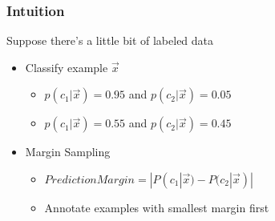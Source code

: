 \documentclass{beamer}
\begin{document}
\begin{frame}                                                                                                 
\frametitle{Intuition}                                                                                  
Suppose there's a little bit of labeled data                                                                  
\newline                                                                                                      
  \begin{itemize}                                                                                             
  \item Classify example $\vec{x}$                                                                               
  \begin{itemize}                                                                                             
    \item $p(c_1 | \vec{x}) = 0.95$ and $p(c_2 | \vec{x}) = 0.05$                                     
    \item $p(c_1 | \vec{x}) = 0.55$ and $p(c_2 | \vec{x}) = 0.45$                                      
    \newline                                                                                                  
  \end{itemize}                                                                                               
  \item Margin Sampling                                                                                       
  \begin{itemize}                                                                                             
    \item $Prediction Margin = |P(c_1 | \vec{x}) - P(c_2 | \vec{x})|$                                            
    \item Annotate examples with smallest margin first                                                        
  \end{itemize}                                                                                               
  \end{itemize}                                                                                               
\end{frame} 
\end{document}
